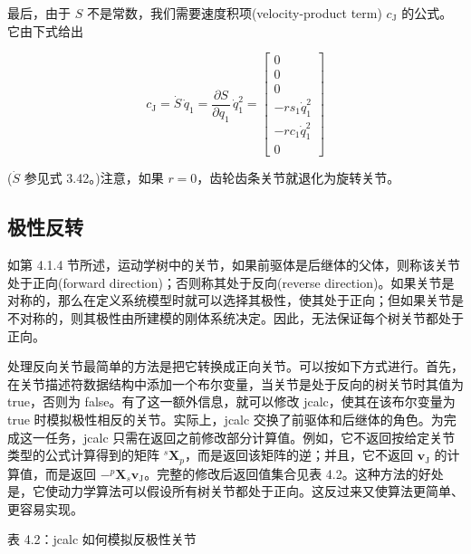 \documentclass[10pt,a4paper]{book}
\theoremstyle{thmstyle} %
\theoremstyle{defstyle} %
\theoremstyle{prostyle} %
\begin{document}
最后，由于 $S$ 不是常数，我们需要速度积项(velocity-product term) $c_{\mathrm{J}}$ 的公式。它由下式给出



$$
c _ { \mathrm { J } } = \dot { S } \, \dot { q } _ { 1 } = \frac { \partial S } { \partial q _ { 1 } } \, \dot { q } _ { 1 } ^{2} = \left[ \begin{array}{l} { { 0 } } \\{ { 0 } } \\{ { 0 } } \\{ { - r s _ { 1 } \dot { q } _ { 1 } ^{2} } } \\{ { - r c _ { 1 } \dot { q } _ { 1 } ^{2} } } \\{ { 0 } } \end{array} \right]
$$



($\dot{S}$ 参见式 3.42。)注意，如果 $r=0$，齿轮齿条关节就退化为旋转关节。



\subsection{极性反转}





如第 4.1.4 节所述，运动学树中的关节，如果前驱体是后继体的父体，则称该关节处于正向(forward direction)；否则称其处于反向(reverse direction)。如果关节是对称的，那么在定义系统模型时就可以选择其极性，使其处于正向；但如果关节是不对称的，则其极性由所建模的刚体系统决定。因此，无法保证每个树关节都处于正向。



处理反向关节最简单的方法是把它转换成正向关节。可以按如下方式进行。首先，在关节描述符数据结构中添加一个布尔变量，当关节是处于反向的树关节时其值为 true，否则为 false。有了这一额外信息，就可以修改 jcalc，使其在该布尔变量为 true 时模拟极性相反的关节。实际上，jcalc 交换了前驱体和后继体的角色。为完成这一任务，jcalc 只需在返回之前修改部分计算值。例如，它不返回按给定关节类型的公式计算得到的矩阵 $^{s}\mathbf{X}_{p}$，而是返回该矩阵的逆；并且，它不返回 $\mathbf{v}_{\mathrm{J}}$ 的计算值，而是返回 $-^{p}\mathbf{X}_{s}\mathbf{v}_{\mathrm{J}}$。完整的修改后返回值集合见表 4.2。这种方法的好处是，它使动力学算法可以假设所有树关节都处于正向。这反过来又使算法更简单、更容易实现。



表 4.2：jcalc 如何模拟反极性关节
\end{document}
